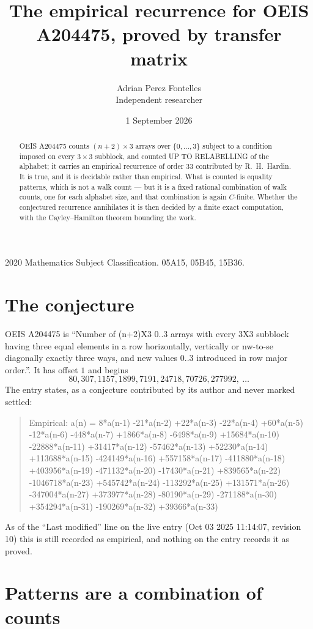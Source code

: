 \documentclass[11pt,a4paper]{article}
\title{The empirical recurrence for OEIS A204475, proved by transfer matrix}
\author{Adrian Perez Fontelles\\ \small Independent researcher}
\date{1 September 2026}
\theoremstyle{plain}
\theoremstyle{definition}
\begin{document}
\maketitle

\begin{abstract}
OEIS A204475 counts $(n+2)\times3$ arrays over $\{0,\dots,3\}$ subject to a condition imposed on
every $3\times3$ subblock, and counted UP TO RELABELLING of the
alphabet; it carries an empirical recurrence of order $33$ contributed by
R.~H.~Hardin. It is true, and it is decidable rather than empirical. What is counted is
equality patterns, which is not a walk count --- but it is a fixed rational combination of
walk counts, one for each alphabet size, and that combination is again $C$-finite. Whether the
conjectured recurrence annihilates it is then decided by a finite exact computation, with the
Cayley--Hamilton theorem bounding the work.
\end{abstract}

\noindent\small 2020 Mathematics Subject Classification. 05A15, 05B45, 15B36.\normalsize

\section{The conjecture}

OEIS A204475 is ``Number of (n+2)X3 0..3 arrays with every 3X3 subblock having three equal elements in a row horizontally, vertically or nw-to-se diagonally exactly three ways, and new values 0..3 introduced in row major order.''. It has offset $1$ and begins
\[
80, 307, 1157, 1899, 7191, 24718, 70726, 277992,\ \dots
\]
The entry states, as a conjecture contributed by its author and never marked settled:
\begin{quote}
Empirical: a(n) = 8*a(n-1) -21*a(n-2) +22*a(n-3) -22*a(n-4) +60*a(n-5) -12*a(n-6) -448*a(n-7) +1866*a(n-8) -6498*a(n-9) +15684*a(n-10) -22888*a(n-11) +31417*a(n-12) -57462*a(n-13) +52230*a(n-14) +113688*a(n-15) -424149*a(n-16) +557158*a(n-17) -411880*a(n-18) +403956*a(n-19) -471132*a(n-20) -17430*a(n-21) +839565*a(n-22) -1046718*a(n-23) +545742*a(n-24) -113292*a(n-25) +131571*a(n-26) -347004*a(n-27) +373977*a(n-28) -80190*a(n-29) -271188*a(n-30) +354294*a(n-31) -190269*a(n-32) +39366*a(n-33)
\end{quote}
As of the ``Last modified'' line on the live entry (Oct 03 2025 11:14:07, revision 10) this is still
recorded as empirical, and nothing on the entry records it as proved.

\section{Patterns are a combination of counts}
\end{document}
